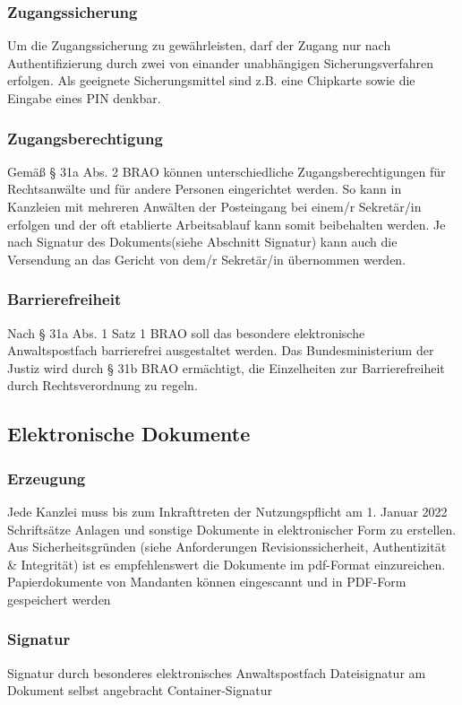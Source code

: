 \subsubsection*{Zugangssicherung}
Um die Zugangssicherung zu gewährleisten, darf der Zugang nur nach Authentifizierung durch zwei von einander unabhängigen Sicherungsverfahren erfolgen. Als geeignete Sicherungsmittel sind z.B. eine Chipkarte sowie die Eingabe eines PIN denkbar.  
\subsubsection*{Zugangsberechtigung}
Gemäß § 31a Abs. 2 BRAO können unterschiedliche Zugangsberechtigungen für Rechtsanwälte und für andere Personen eingerichtet werden. So kann in Kanzleien mit mehreren Anwälten der Posteingang bei einem/r Sekretär/in erfolgen und der oft etablierte Arbeitsablauf kann somit beibehalten werden.  Je nach Signatur des Dokuments(siehe Abschnitt Signatur) kann auch die Versendung an das Gericht von dem/r Sekretär/in übernommen werden.

\subsubsection*{Barrierefreiheit}
Nach § 31a Abs. 1 Satz 1 BRAO soll das besondere elektronische Anwaltspostfach barrierefrei ausgestaltet werden. Das Bundesministerium der Justiz wird durch § 31b BRAO ermächtigt, die Einzelheiten zur Barrierefreiheit durch Rechtsverordnung zu regeln.
\subsection{Elektronische Dokumente}
\subsubsection*{Erzeugung}
Jede Kanzlei muss bis zum Inkrafttreten der Nutzungspflicht am 1. Januar 2022 Schriftsätze Anlagen und sonstige Dokumente in elektronischer Form zu erstellen. Aus Sicherheitsgründen (siehe Anforderungen Revisionssicherheit, Authentizität \& Integrität) ist es empfehlenswert die Dokumente im pdf-Format einzureichen.  Papierdokumente von Mandanten können eingescannt und in PDF-Form gespeichert werden


\subsubsection*{Signatur}
Signatur durch besonderes elektronisches Anwaltspostfach
Dateisignatur am Dokument selbst angebracht
Container-Signatur
